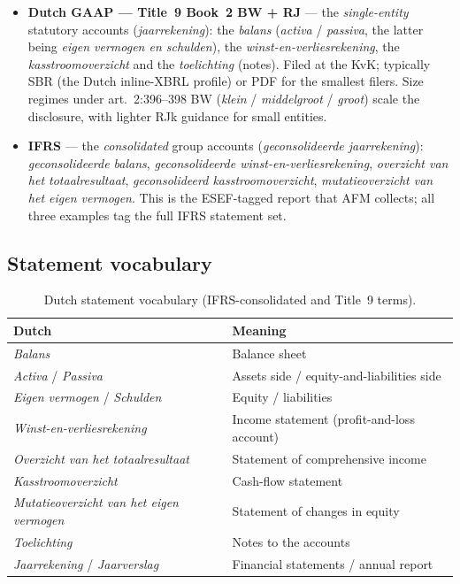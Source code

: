 \documentclass[11pt,a4paper]{report}
\begin{document}
\begin{itemize}
  \item \textbf{Dutch GAAP --- Title~9 Book~2 BW + RJ} --- the \emph{single-entity} statutory accounts
    (\emph{jaarrekening}): the \emph{balans} (\emph{activa} / \emph{passiva}, the latter being \emph{eigen
    vermogen en schulden}), the \emph{winst-en-verliesrekening}, the \emph{kasstroomoverzicht} and the
    \emph{toelichting} (notes). Filed at the KvK; typically SBR (the Dutch inline-XBRL profile) or PDF for the
    smallest filers. Size regimes under art.~2:396--398 BW (\emph{klein} / \emph{middelgroot} / \emph{groot})
    scale the disclosure, with lighter RJk guidance for small entities.
  \item \textbf{IFRS} --- the \emph{consolidated} group accounts (\emph{geconsolideerde jaarrekening}):
    \emph{geconsolideerde balans}, \emph{geconsolideerde winst-en-verliesrekening}, \emph{overzicht van het
    totaalresultaat}, \emph{geconsolideerd kasstroomoverzicht}, \emph{mutatieoverzicht van het eigen
    vermogen}. This is the ESEF-tagged report that AFM collects; all three examples tag the full IFRS
    statement set.
\end{itemize}

\subsection{Statement vocabulary}

\begin{table}[h]
\centering
\caption{Dutch statement vocabulary (IFRS-consolidated and Title~9 terms).}
\label{tab:nl-vocab}
\small
\begin{tabular}{@{}p{}p{}@{}}
\toprule
\textbf{Dutch} & \textbf{Meaning} \\
\midrule
\emph{Balans} & Balance sheet \\
\emph{Activa} / \emph{Passiva} & Assets side / equity-and-liabilities side \\
\emph{Eigen vermogen} / \emph{Schulden} & Equity / liabilities \\
\emph{Winst-en-verliesrekening} & Income statement (profit-and-loss account) \\
\emph{Overzicht van het totaalresultaat} & Statement of comprehensive income \\
\emph{Kasstroomoverzicht} & Cash-flow statement \\
\emph{Mutatieoverzicht van het eigen vermogen} & Statement of changes in equity \\
\emph{Toelichting} & Notes to the accounts \\
\emph{Jaarrekening} / \emph{Jaarverslag} & Financial statements / annual report \\
\bottomrule
\end{tabular}
\end{table}
\end{document}
